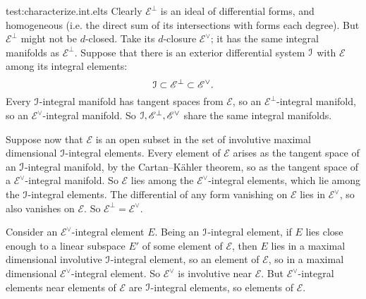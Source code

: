 \begin{answer}{test:characterize.int.elts}
Clearly \(\mathscr{E}^{\perp}\) is an ideal of differential forms, and homogeneous (i.e. the direct sum of its intersections with forms each degree).
But \(\mathscr{E}^{\perp}\) might not be \(d\)-closed.
Take its \(d\)-closure \(\mathscr{E}^{\vee}\); it has the same integral manifolds as \(\mathscr{E}^{\perp}\).
Suppose that there is an exterior differential system \(\mathcal{I}\) with \(\mathscr{E}\) among its integral elements: 
\[
\mathcal{I}\subset\mathscr{E}^{\perp}\subset\mathscr{E}^{\vee}.
\]
Every \(\mathcal{I}\)-integral manifold has tangent spaces from \(\mathscr{E}\), so an \(\mathscr{E}^{\perp}\)-integral manifold, so an \(\mathscr{E}^{\vee}\)-integral manifold.
So \(\mathcal{I},\mathscr{E}^{\perp},\mathscr{E}^{\vee}\) share the same integral manifolds.

Suppose now that \(\mathscr{E}\) is an open subset in the set of involutive maximal dimensional \(\mathcal{I}\)-integral elements.
Every element of \(\mathscr{E}\) arises as the tangent space of an \(\mathcal{I}\)-integral manifold, by the Cartan--K\"ahler theorem, so as the tangent space of a \(\mathscr{E}^{\vee}\)-integral manifold.
So \(\mathscr{E}\) lies among the \(\mathscr{E}^{\vee}\)-integral elements, which lie among the \(\mathcal{I}\)-integral elements.
The differential of any form vanishing on \(\mathscr{E}\) lies in \(\mathscr{E}^{\vee}\), so also vanishes on \(\mathscr{E}\).
So \(\mathscr{E}^{\perp}=\mathscr{E}^{\vee}\).

Consider an \(\mathscr{E}^{\vee}\)-integral element \(E\).
Being an \(\mathcal{I}\)-integral element, if \(E\) lies close enough to a linear subspace \(E'\) of some element of \(\mathscr{E}\), then \(E\) lies in a maximal dimensional involutive \(\mathcal{I}\)-integral element, so an element of \(\mathscr{E}\), so in a maximal dimensional \(\mathscr{E}^{\vee}\)-integral element.
So \(\mathscr{E}^{\vee}\) is involutive near \(\mathscr{E}\).
But \(\mathscr{E}^{\vee}\)-integral elements near elements of \(\mathscr{E}\) are \(\mathcal{I}\)-integral elements, so elements of \(\mathscr{E}\).
\end{answer}

